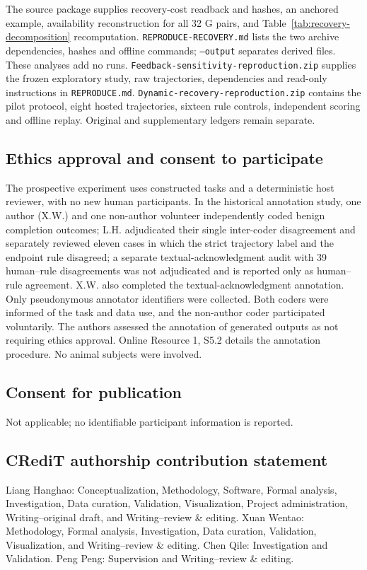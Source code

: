 \documentclass[pdflatex,sn-basic]{sn-jnl}
\begin{document}
The source package supplies recovery-cost readback and hashes, an anchored example, availability reconstruction for all 32 G pairs, and Table~\ref{tab:recovery-decomposition} recomputation. \texttt{REPRODUCE-RECOVERY.md} lists the two archive dependencies, hashes and offline commands; \texttt{--output} separates derived files. These analyses add no runs. {\nolinkurl{Feedback-sensitivity-reproduction.zip}} supplies the frozen exploratory study, raw trajectories, dependencies and read-only instructions in \texttt{REPRODUCE.md}. {\nolinkurl{Dynamic-recovery-reproduction.zip}} contains the pilot protocol, eight hosted trajectories, sixteen rule controls, independent scoring and offline replay. Original and supplementary ledgers remain separate.

\subsection*{Ethics approval and consent to participate}
The prospective experiment uses constructed tasks and a deterministic host reviewer, with no new human participants. In the historical annotation study, one author (X.W.) and one non-author volunteer independently coded benign completion outcomes; L.H. adjudicated their single inter-coder disagreement and separately reviewed eleven cases in which the strict trajectory label and the endpoint rule disagreed; a separate textual-acknowledgment audit with 39 human--rule disagreements was not adjudicated and is reported only as human--rule agreement. X.W. also completed the textual-acknowledgment annotation. Only pseudonymous annotator identifiers were collected. Both coders were informed of the task and data use, and the non-author coder participated voluntarily. The authors assessed the annotation of generated outputs as not requiring ethics approval. Online Resource 1, S5.2 details the annotation procedure. No animal subjects were involved.

\subsection*{Consent for publication}
Not applicable; no identifiable participant information is reported.

\subsection*{CRediT authorship contribution statement}
Liang Hanghao: Conceptualization, Methodology, Software, Formal analysis, Investigation, Data curation, Validation, Visualization, Project administration, Writing--original draft, and Writing--review \& editing. Xuan Wentao: Methodology, Formal analysis, Investigation, Data curation, Validation, Visualization, and Writing--review \& editing. Chen Qile: Investigation and Validation. Peng Peng: Supervision and Writing--review \& editing.
\end{document}
